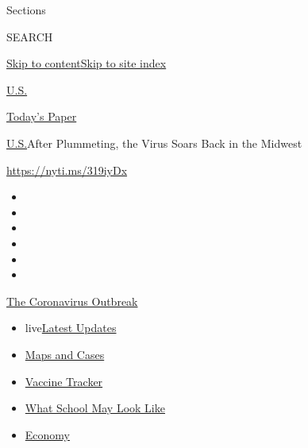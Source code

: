 Sections

SEARCH

\protect\hyperlink{site-content}{Skip to
content}\protect\hyperlink{site-index}{Skip to site index}

\href{https://www.nytimes.com/section/us}{U.S.}

\href{https://myaccount.nytimes.com/auth/login?response_type=cookie\&client_id=vi}{}

\href{https://www.nytimes.com/section/todayspaper}{Today's Paper}

\href{/section/us}{U.S.}\textbar{}After Plummeting, the Virus Soars Back
in the Midwest

\url{https://nyti.ms/319iyDx}

\begin{itemize}
\item
\item
\item
\item
\item
\item
\end{itemize}

\href{https://www.nytimes.com/news-event/coronavirus?action=click\&pgtype=Article\&state=default\&region=TOP_BANNER\&context=storylines_menu}{The
Coronavirus Outbreak}

\begin{itemize}
\tightlist
\item
  live\href{https://www.nytimes.com/2020/08/01/world/coronavirus-covid-19.html?action=click\&pgtype=Article\&state=default\&region=TOP_BANNER\&context=storylines_menu}{Latest
  Updates}
\item
  \href{https://www.nytimes.com/interactive/2020/us/coronavirus-us-cases.html?action=click\&pgtype=Article\&state=default\&region=TOP_BANNER\&context=storylines_menu}{Maps
  and Cases}
\item
  \href{https://www.nytimes.com/interactive/2020/science/coronavirus-vaccine-tracker.html?action=click\&pgtype=Article\&state=default\&region=TOP_BANNER\&context=storylines_menu}{Vaccine
  Tracker}
\item
  \href{https://www.nytimes.com/interactive/2020/07/29/us/schools-reopening-coronavirus.html?action=click\&pgtype=Article\&state=default\&region=TOP_BANNER\&context=storylines_menu}{What
  School May Look Like}
\item
  \href{https://www.nytimes.com/live/2020/07/31/business/stock-market-today-coronavirus?action=click\&pgtype=Article\&state=default\&region=TOP_BANNER\&context=storylines_menu}{Economy}
\end{itemize}

